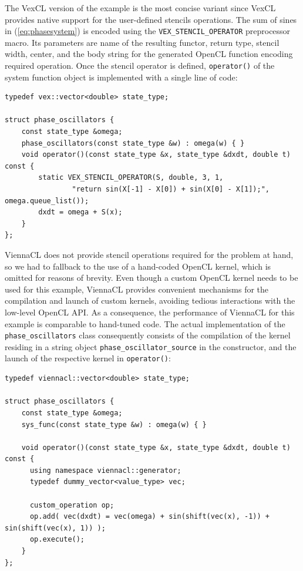 \documentclass[final]{siamltex}
\newcommand{\code}[1]{\lstinline$#1$}
\newcommand{\eqref}[1]{(\ref{#1})}
\begin{document}
The VexCL version of the example is the most concise variant since VexCL
provides native support for the user-defined stencils operations. The sum of
sines in \eqref{eq:phasesystem} is encoded using the
\code{VEX_STENCIL_OPERATOR} preprocessor macro. Its parameters are name of the
resulting functor, return type, stencil width, center, and the body string for
the generated OpenCL function encoding required operation.  Once the stencil
operator is defined, \code{operator()} of the system function object is
implemented with a single line of code:
\begin{lstlisting}
typedef vex::vector<double> state_type;

struct phase_oscillators {
    const state_type &omega;
    phase_oscillators(const state_type &w) : omega(w) { }
    void operator()(const state_type &x, state_type &dxdt, double t) const {
        static VEX_STENCIL_OPERATOR(S, double, 3, 1,
                "return sin(X[-1] - X[0]) + sin(X[0] - X[1]);", omega.queue_list());
        dxdt = omega + S(x);
    }
};
\end{lstlisting}


ViennaCL does not provide stencil operations required for the problem at hand, so we had
to fallback to the use of a hand-coded OpenCL kernel, which is omitted for
reasons of brevity.  Even though a custom OpenCL kernel needs to be used for
this example, ViennaCL provides convenient mechanisms for the compilation and
launch of custom kernels, avoiding tedious interactions with the low-level
OpenCL API.  As a consequence, the performance of ViennaCL for this example is
comparable to hand-tuned code.  The actual implementation of the
\code{phase_oscillators} class consequently consists of the compilation of the
kernel residing in a string object \code{phase_oscillator_source} in the
constructor, and the launch of the respective kernel in \code{operator()}:
\begin{lstlisting}
typedef viennacl::vector<double> state_type;

struct phase_oscillators {
    const state_type &omega;
    sys_func(const state_type &w) : omega(w) { }

    void operator()(const state_type &x, state_type &dxdt, double t) const {
      using namespace viennacl::generator;
      typedef dummy_vector<value_type> vec;

      custom_operation op;
      op.add( vec(dxdt) = vec(omega) + sin(shift(vec(x), -1)) + sin(shift(vec(x), 1)) );
      op.execute();
    }
};
\end{lstlisting}
\end{document}
